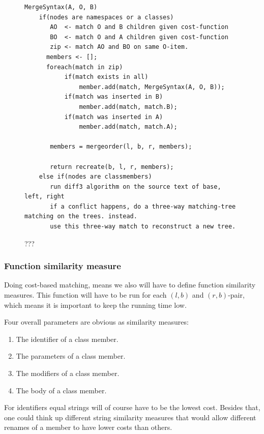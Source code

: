 \documentclass[11pt]{article}
\begin{document}
\begin{figure}
\begin{verbatim}
MergeSyntax(A, O, B)
    if(nodes are namespaces or a classes)
       AO  <- match O and B children given cost-function
       BO  <- match O and A children given cost-function
       zip <- match AO and BO on same O-item.
      members <- [];
      foreach(match in zip)
           if(match exists in all)
               member.add(match, MergeSyntax(A, O, B));
           if(match was inserted in B)
               member.add(match, match.B);
           if(match was inserted in A)
               member.add(match, match.A);
    
       members = mergeorder(l, b, r, members);

       return recreate(b, l, r, members);        
    else if(nodes are classmembers)
       run diff3 algorithm on the source text of base, left, right
       if a conflict happens, do a three-way matching-tree matching on the trees. instead.
       use this three-way match to reconstruct a new tree.
\end{verbatim}
\caption{???}
\label{TreeMergeAlgorithm}
\end{figure}



\subsubsection{Function similarity measure}
Doing cost-based matching, means we also will have to define function similarity measures. This function will have to be run for each $(l, b)$ and $(r, b)$-pair, which means it is important to keep the running time low.

Four overall parameters are obvious as similarity measures:

\begin{enumerate}
    \item The identifier of a class member.
    \item The parameters of a class member.
    \item The modifiers of a class member.
    \item The body of a class member.
\end{enumerate}

For identifiers equal strings will of course have to be the lowest cost. Besides that, one could think up different string similarity measures that would allow different renames of a member to have lower costs than others.
\end{document}

